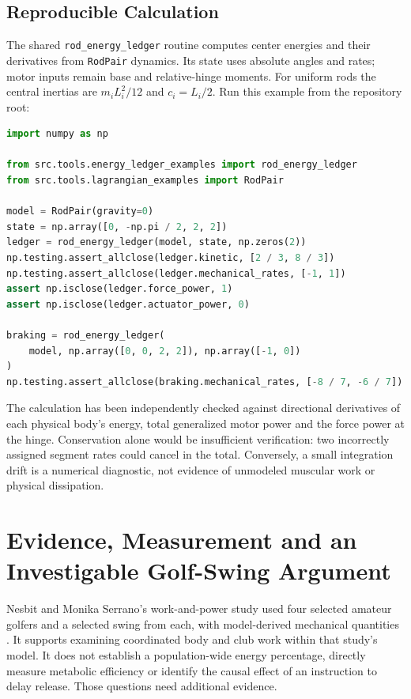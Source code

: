 \subsection{Reproducible Calculation}

The shared \texttt{rod\_energy\_ledger} routine computes center energies and
their derivatives from \texttt{RodPair} dynamics. Its state uses absolute
angles and rates; motor inputs remain base and relative-hinge moments. For
uniform rods the central inertias are $m_iL_i^2/12$ and $c_i=L_i/2$.
Run this example from the repository root:

\begin{lstlisting}[language=Python,columns=fullflexible,basicstyle=\ttfamily\footnotesize,keywordstyle=\color{chapblue},stringstyle=\color{purplehaze},commentstyle=\color{chapblue},numberstyle=\tiny\color{black!65}]
import numpy as np

from src.tools.energy_ledger_examples import rod_energy_ledger
from src.tools.lagrangian_examples import RodPair

model = RodPair(gravity=0)
state = np.array([0, -np.pi / 2, 2, 2])
ledger = rod_energy_ledger(model, state, np.zeros(2))
np.testing.assert_allclose(ledger.kinetic, [2 / 3, 8 / 3])
np.testing.assert_allclose(ledger.mechanical_rates, [-1, 1])
assert np.isclose(ledger.force_power, 1)
assert np.isclose(ledger.actuator_power, 0)

braking = rod_energy_ledger(
    model, np.array([0, 0, 2, 2]), np.array([-1, 0])
)
np.testing.assert_allclose(braking.mechanical_rates, [-8 / 7, -6 / 7])
\end{lstlisting}

The calculation has been independently checked against directional derivatives
of each physical body's energy, total generalized motor power and the force
power at the hinge. Conservation alone would be insufficient verification:
two incorrectly assigned segment rates could cancel in the total. Conversely,
a small integration drift is a numerical diagnostic, not evidence of unmodeled
muscular work or physical dissipation.

\section[Evidence, Measurement and an Investigable Golf-Swing Argument]{Evidence, Measurement and an\\Investigable Golf-Swing Argument}
\label{sec:energy_summary}

Nesbit and Monika Serrano's work-and-power study used four selected amateur
golfers and a selected swing from each, with model-derived mechanical quantities
\citep{Nesbit2005b}. It supports examining coordinated body and club work within
that study's model. It does not establish a population-wide energy percentage,
directly measure metabolic efficiency or identify the causal effect of an
instruction to delay release. Those questions need additional evidence.

